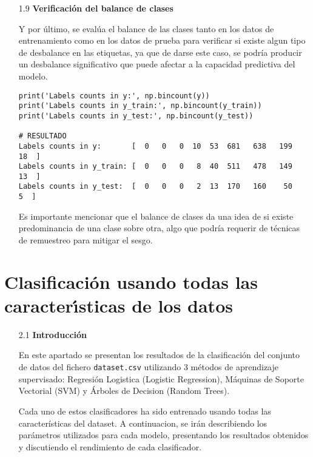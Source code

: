 \documentclass{article}
\begin{document}
\bigskip

\begin{itemize}

\item[1.9]  {\bf Verificaci\'on del balance de clases}

Y por \'ultimo, se eval\'ua el balance de las clases tanto en los datos de entrenamiento como en los datos de prueba para verificar si existe algun tipo de desbalance en las etiquetas, ya que de darse este caso, se podr\'ia producir un desbalance significativo que puede afectar a la capacidad predictiva del modelo.

\begin{tcolorbox}[width=14cm]
\begin{scriptsize}
\begin{verbatim}
print('Labels counts in y:', np.bincount(y))
print('Labels counts in y_train:', np.bincount(y_train))
print('Labels counts in y_test:', np.bincount(y_test))

# RESULTADO
Labels counts in y:       [  0   0   0  10  53  681   638   199   18  ]
Labels counts in y_train: [  0   0   0   8  40  511   478   149   13  ]
Labels counts in y_test:  [  0   0   0   2  13  170   160    50    5  ]
\end{verbatim}
\end{scriptsize}
\end{tcolorbox}

Es importante mencionar que el balance de clases da una idea de si existe predominancia de una clase sobre otra, algo que podr\'ia requerir de t\'ecnicas de remuestreo para mitigar el sesgo.

\end{itemize}


\newpage

\section[2]{Clasificaci\'on usando todas las caracter\'{\i}sticas de los datos}

\bigskip

\begin{itemize}

\item[2.1]  {\bf Introducci\'on}

En este apartado se presentan los resultados de la clasificaci\'on del conjunto de datos del fichero \texttt{dataset.csv} utilizando 3 m\'etodos de aprendizaje supervisado: Regresi\'on Logistica (Logistic Regression), M\'aquinas de Soporte Vectorial (SVM) y \'Arboles de Decision (Random Trees).

Cada uno de estos clasificadores ha sido entrenado usando todas las caracter\'isticas del dataset. A continuacion, se ir\'an describiendo los par\'ametros utilizados para cada modelo, presentando los resultados obtenidos y discutiendo el rendimiento de cada clasificador.

\end{itemize}
\end{document}
